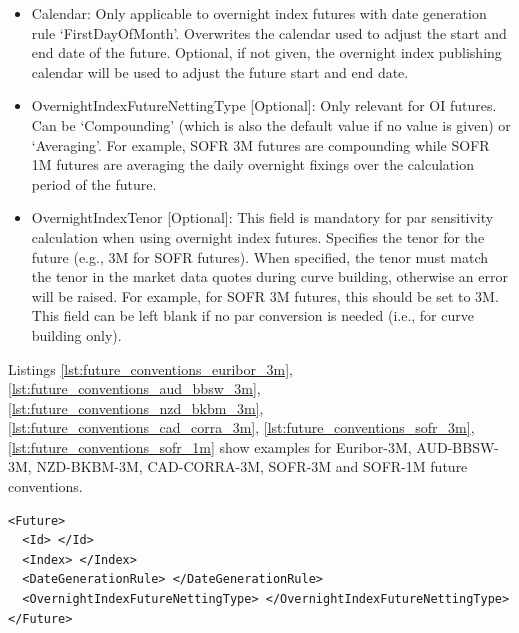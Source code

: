\begin{itemize}
\begin{itemize}
    the start and end date are adjusted to the next business day w.r.t. roll convention `following' and the overnight
    index calendar - or if given the calendar given in the field `Calendar'. This tenor is
    derived from the market quote, see \ref{ss:market_data_oi_index_future_prices}.
  \end{itemize}
\item Calendar: Only applicable to overnight index futures with date generation rule `FirstDayOfMonth'. Overwrites the
    calendar used to adjust the start and end date of the future. Optional, if not given, the overnight index publishing
    calendar will be used to adjust the future start and end date.
\item OvernightIndexFutureNettingType [Optional]: Only relevant for OI futures. Can be `Compounding' (which is also the
  default value if no value is given) or `Averaging'. For example, SOFR 3M futures are compounding while SOFR 1M futures
  are averaging the daily overnight fixings over the calculation period of the future.
\item OvernightIndexTenor [Optional]: This field is mandatory for par sensitivity calculation when using overnight index futures.
  Specifies the tenor for the future (e.g., 3M for SOFR futures). When specified, the tenor must match the tenor in the market data quotes during curve
  building, otherwise an error will be raised. For example, for SOFR 3M futures, this should be set to 3M. This field can be left blank if no par conversion
  is needed (i.e., for curve building only).
\end{itemize}

Listings \ref{lst:future_conventions_euribor_3m}, \ref{lst:future_conventions_aud_bbsw_3m},
\ref{lst:future_conventions_nzd_bkbm_3m}, \ref{lst:future_conventions_cad_corra_3m},
\ref{lst:future_conventions_sofr_3m}, \ref{lst:future_conventions_sofr_1m} show examples for Euribor-3M,
AUD-BBSW-3M, NZD-BKBM-3M, CAD-CORRA-3M, SOFR-3M and SOFR-1M future conventions.

\begin{listing}[H]
\begin{verbatim}
<Future>
  <Id> </Id>
  <Index> </Index>
  <DateGenerationRule> </DateGenerationRule>
  <OvernightIndexFutureNettingType> </OvernightIndexFutureNettingType>
</Future>
\end{verbatim}
\caption{Future conventions}
\label{lst:future_conventions}
\end{listing}

